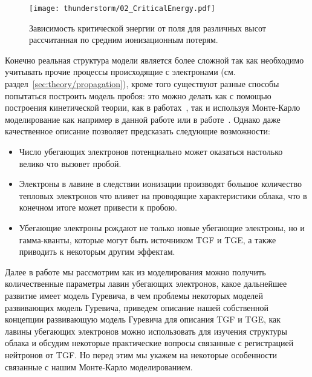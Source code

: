 \begin{figure}[t]
    \begin{center}

\texttt{[image: thunderstorm/02\_CriticalEnergy.pdf]} 
        \caption{Зависимость критической энергии от поля для различных высот рассчитанная по средним ионизационным потерям.}
    \end{center}
    \label{fig:storm:crit}
\end{figure}
Конечно реальная структура модели является более сложной так как необходимо учитывать прочие процессы происходящие с электронами (см. раздел~\ref{sec:theory/propagation}), кроме того существуют разные способы попытаться построить модель пробоя: это можно делать как с помощью построения кинетической теории, как в работах~\cite{gurevich1992runaway, Gurevich2001ufn}, так и используя Монте-Карло моделирование как например в данной работе или в работе~\cite{dwyer2003fundamental}. Однако даже качественное описание позволяет предсказать следующие возможности:
\begin{itemize}
   \item Число убегающих электронов потенциально может оказаться настолько велико что вызовет пробой.
   \item Электроны в лавине в следствии ионизации производят большое количество тепловых электронов что влияет на проводящие характеристики облака, что в конечном итоге может привести к пробою.
   \item Убегающие электроны рождают не только новые убегающие электроны, но и гамма-кванты, которые могут быть источником TGF и TGE, а также приводить к некоторым другим эффектам.
\end{itemize}
Далее в работе мы рассмотрим как из моделирования можно получить количественные параметры лавин убегающих электронов, какое дальнейшее развитие имеет модель Гуревича, в чем проблемы некоторых моделей развивающих модель Гуревича, приведем описание нашей собственной концепции развивающую модель Гуревича для описания TGF и TGE, как лавины убегающих электронов можно использовать для изучения структуры облака и обсудим некоторые практические вопросы связанные с регистрацией нейтронов от TGF. Но перед этим мы укажем на некоторые особенности связанные с нашим Монте-Карло моделированием.



